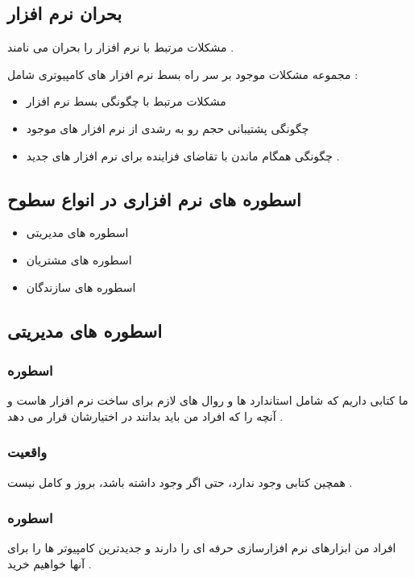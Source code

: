 \documentclass{article}
\begin{document}
\subsection{بحران نرم افزار}

مشکلات مرتبط با نرم افزار را بحران می نامند .

مجموعه مشکلات موجود بر سر راه بسط نرم افزار های کامپیوتری شامل :

\begin{itemize}
	\item مشکلات مرتبط با چگونگی بسط نرم افزار
	\item چگونگی پشتیبانی حجم رو به رشدی از نرم افزار های موجود
	\item چگونگی همگام ماندن با تقاضای فزاینده برای نرم افزار های جدید .
\end{itemize}



\subsection{اسطوره های نرم افزاری در انواع سطوح}

\begin{itemize}
	\item اسطوره های مدیریتی
	\item اسطوره های مشتریان
	\item اسطوره های سازندگان
\end{itemize}

\newpage

\subsection{اسطوره های مدیریتی}

\subsubsection{اسطوره}
ما کتابی داریم که شامل استاندارد ها و روال های لازم برای ساخت نرم افزار هاست و آنچه را که افراد من باید بدانند در اختیارشان قرار می دهد .


\subsubsection{واقعیت}
همچین کتابی وجود ندارد، حتی اگر وجود داشته باشد، بروز و کامل نیست .





\subsubsection{اسطوره}
افراد من ابزارهای نرم افزارسازی حرفه ای را دارند و جدیدترین کامپیوتر ها را برای آنها خواهیم خرید .
\end{document}

